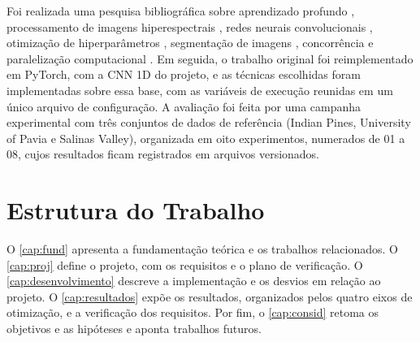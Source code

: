 Foi realizada uma pesquisa bibliográfica sobre aprendizado profundo \cite{DeeplearningLC, DeepLearningIG}, processamento de imagens hiperespectrais \cite{Li2019DeepLF, Ahmad_2025, Qian2020}, redes neurais convolucionais \cite{Gradient-basedlearningappliedtodocumentrecognition, NIPS2012_c399862d}, otimização de hiperparâmetros \cite{WU201926, liashchynskyi2019gridsearchrandomsearch, Akiba2019Optuna}, segmentação de imagens \cite{bergh2013seedssuperpixelsextractedenergydriven, Zhengqin7298741, Najman546254}, concorrência \cite{Silberschatz2018, Amdahl1967} e paralelização computacional \cite{Aach2025, Nandan10910577, CUDA_Programming}. Em seguida, o trabalho original foi reimplementado em PyTorch, com a CNN 1D do projeto, e as técnicas escolhidas foram implementadas sobre essa base, com as variáveis de execução reunidas em um único arquivo de configuração. A avaliação foi feita por uma campanha experimental com três conjuntos de dados de referência (Indian Pines, University of Pavia e Salinas Valley), organizada em oito experimentos, numerados de 01 a 08, cujos resultados ficam registrados em arquivos versionados.

\section{Estrutura do Trabalho}

O \autoref{cap:fund} apresenta a fundamentação teórica e os trabalhos relacionados. O \autoref{cap:proj} define o projeto, com os requisitos e o plano de verificação. O \autoref{cap:desenvolvimento} descreve a implementação e os desvios em relação ao projeto. O \autoref{cap:resultados} expõe os resultados, organizados pelos quatro eixos de otimização, e a verificação dos requisitos. Por fim, o \autoref{cap:consid} retoma os objetivos e as hipóteses e aponta trabalhos futuros.
